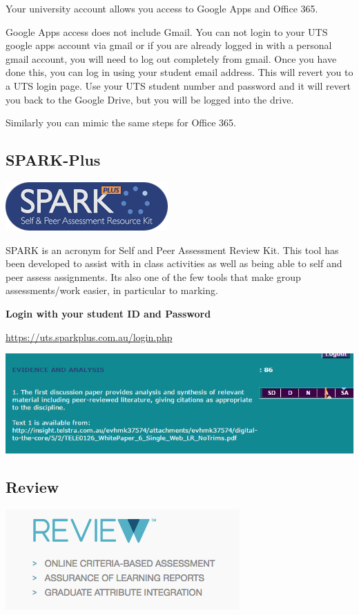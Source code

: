 \documentclass[]{book}
\theoremstyle{definition}
\theoremstyle{definition}
\theoremstyle{remark}
\begin{document}
Your university account allows you access to Google Apps and Office 365.

Google Apps access does not include Gmail. You can not login to your UTS
google apps account via gmail or if you are already logged in with a
personal gmail account, you will need to log out completely from gmail.
Once you have done this, you can log in using your student email
address. This will revert you to a UTS login page. Use your UTS student
number and password and it will revert you back to the Google Drive, but
you will be logged into the drive.

Similarly you can mimic the same steps for Office 365.

\subsection{SPARK-Plus}\label{spark-plus}

\includegraphics[width=0.25\linewidth]{images/SPARKlogo}

SPARK is an acronym for Self and Peer Assessment Review Kit. This tool
has been developed to assist with in class activities as well as being
able to self and peer assess assignments. Its also one of the few tools
that make group assessments/work easier, in particular to marking.

\textbf{Login with your student ID and Password}

\url{https://uts.sparkplus.com.au/login.php}

\includegraphics{images/spark.jpg}

\subsection{Review}\label{review}

\includegraphics[width=0.4\linewidth]{images/Reviewlogo}
\end{document}
